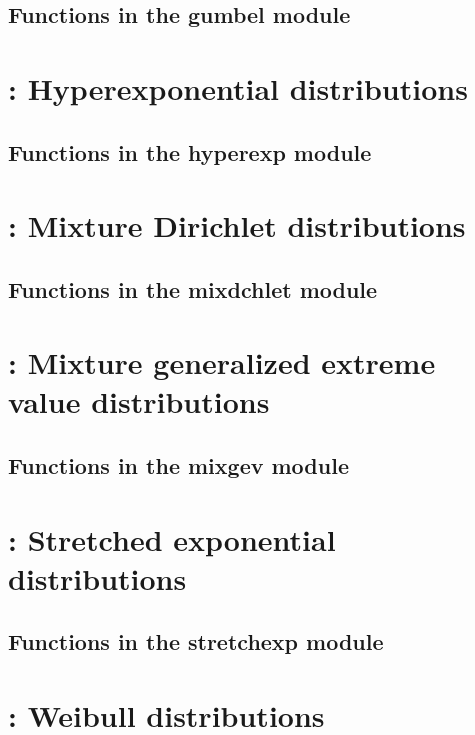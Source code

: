\documentclass[11pt]{book}
\begin{document}
\subsection{Functions in the gumbel module}


\newpage
\section{: Hyperexponential distributions}

\subsection{Functions in the hyperexp module}


\newpage
\section{: Mixture Dirichlet distributions}
%
\subsection{Functions in the mixdchlet module}
%

\newpage
\section{: Mixture generalized extreme value distributions}
%
\subsection{Functions in the mixgev module}


\newpage
\section{: Stretched exponential distributions}

\subsection{Functions in the stretchexp module}


\newpage
\section{: Weibull distributions}

\end{document}
